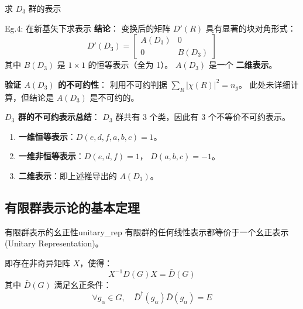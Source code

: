 \begin{example}{求 $D_3$ 群的表示}
\begin{example}{Eg.4: 在新基矢下求表示}
        \textbf{结论}：
        变换后的矩阵 $D'(R)$ 具有显著的块对角形式：
        \begin{equation}
            D'(D_3) = \begin{bmatrix} A(D_3) & 0 \\ 0 & B(D_3) \end{bmatrix}
        \end{equation}
        其中 $B(D_3)$ 是 $1 \times 1$ 的恒等表示（全为 1）。
        $A(D_3)$ 是一个 \textbf{二维表示}。

        \textbf{验证 $A(D_3)$ 的不可约性}：
        利用不可约判据 $\sum_R |\chi(R)|^2 = n_g$。
        此处未详细计算，但结论是 $A(D_3)$ 是不可约的。

        \textbf{$D_3$ 群的不可约表示总结}：
        $D_3$ 群共有 3 个类，因此有 3 个不等价不可约表示。
        \begin{enumerate}
            \item \textbf{一维恒等表示}：$D(e, d, f, a, b, c) = 1$。
            \item \textbf{一维非恒等表示}：$D(e, d, f) = 1$， $D(a, b, c) = -1$。
            \item \textbf{二维表示}：即上述推导出的 $A(D_3)$。
        \end{enumerate}
    \end{example}
\end{example}










\subsection{有限群表示论的基本定理}

\begin{theorem}{有限群表示的幺正性}{unitary_rep}
    有限群的任何线性表示都等价于一个幺正表示 (Unitary Representation)。
    
    即存在非奇异矩阵 $X$，使得：
    \begin{equation}
        X^{-1}D(G)X = \bar{D}(G)
    \end{equation}
    其中 $\bar{D}(G)$ 满足幺正条件：
    \begin{equation}
        \forall g_\alpha \in G, \quad \bar{D}^\dagger(g_\alpha)\bar{D}(g_\alpha) = E
    \end{equation}
    
\end{theorem}

